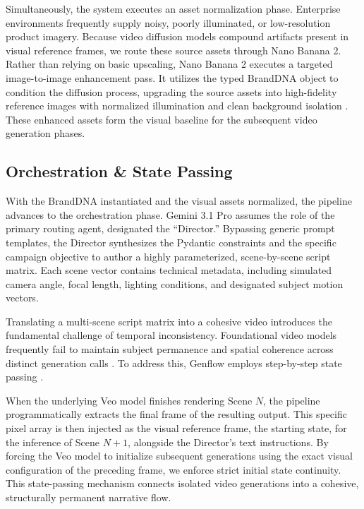 \documentclass[sigconf]{acmart}
\begin{document}
Simultaneously, the system executes an asset normalization phase. Enterprise environments frequently supply noisy, poorly illuminated, or low-resolution product imagery. Because video diffusion models compound artifacts present in visual reference frames, we route these source assets through Nano Banana 2. Rather than relying on basic upscaling, Nano Banana 2 executes a targeted image-to-image enhancement pass. It utilizes the typed BrandDNA object to condition the diffusion process, upgrading the source assets into high-fidelity reference images with normalized illumination and clean background isolation \cite{ramesh2022hierarchical}. These enhanced assets form the visual baseline for the subsequent video generation phases.

\subsection{Orchestration \& State Passing}

With the BrandDNA instantiated and the visual assets normalized, the pipeline advances to the orchestration phase. Gemini 3.1 Pro assumes the role of the primary routing agent, designated the ``Director.'' Bypassing generic prompt templates, the Director synthesizes the Pydantic constraints and the specific campaign objective to author a highly parameterized, scene-by-scene script matrix. Each scene vector contains technical metadata, including simulated camera angle, focal length, lighting conditions, and designated subject motion vectors.

Translating a multi-scene script matrix into a cohesive video introduces the fundamental challenge of temporal inconsistency. Foundational video models frequently fail to maintain subject permanence and spatial coherence across distinct generation calls \cite{blattmann2023stable}. To address this, Genflow employs step-by-step state passing \cite{blattmann2023align}.

When the underlying Veo model finishes rendering Scene $N$, the pipeline programmatically extracts the final frame of the resulting output. This specific pixel array is then injected as the visual reference frame, the starting state, for the inference of Scene $N+1$, alongside the Director's text instructions. By forcing the Veo model to initialize subsequent generations using the exact visual configuration of the preceding frame, we enforce strict initial state continuity. This state-passing mechanism connects isolated video generations into a cohesive, structurally permanent narrative flow.
\end{document}
